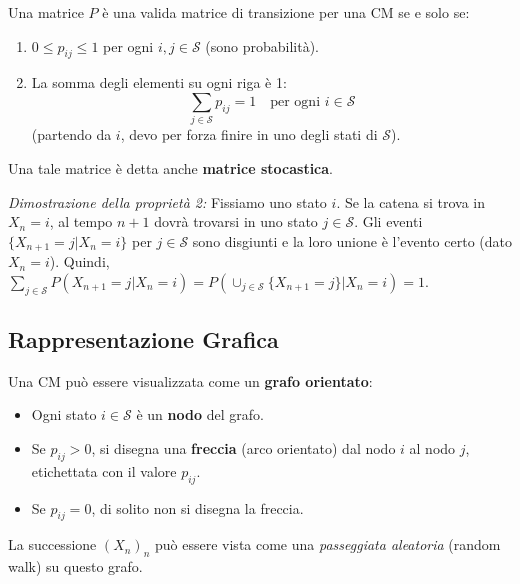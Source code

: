 \begin{theorem}
Una matrice $P$ è una valida matrice di transizione per una CM se e solo se:
\begin{enumerate}
    \item $0 \le p_{ij} \le 1$ per ogni $i, j \in \mathcal{S}$ (sono probabilità).
    \item La somma degli elementi su ogni riga è 1:
    \begin{equation}
        \sum_{j \in \mathcal{S}} p_{ij} = 1 \quad \text{per ogni } i \in \mathcal{S}
    \end{equation}
    (partendo da $i$, devo per forza finire in uno degli stati di $\mathcal{S}$).
\end{enumerate}
Una tale matrice è detta anche \textbf{matrice stocastica}.
\end{theorem}
\textit{Dimostrazione della proprietà 2:}
Fissiamo uno stato $i$. Se la catena si trova in $X_n=i$, al tempo $n+1$ dovrà trovarsi in uno stato $j \in \mathcal{S}$. Gli eventi $\{X_{n+1}=j | X_n=i\}$ per $j \in \mathcal{S}$ sono disgiunti e la loro unione è l'evento certo (dato $X_n=i$). Quindi, $\sum_{j \in \mathcal{S}} P(X_{n+1}=j | X_n=i) = P(\cup_{j \in \mathcal{S}} \{X_{n+1}=j\} | X_n=i) = 1$.

\subsection{Rappresentazione Grafica}
Una CM può essere visualizzata come un \textbf{grafo orientato}:
\begin{itemize}
    \item Ogni stato $i \in \mathcal{S}$ è un \textbf{nodo} del grafo.
    \item Se $p_{ij} > 0$, si disegna una \textbf{freccia} (arco orientato) dal nodo $i$ al nodo $j$, etichettata con il valore $p_{ij}$.
    \item Se $p_{ij} = 0$, di solito non si disegna la freccia.
\end{itemize}
La successione $(X_n)_n$ può essere vista come una \textit{passeggiata aleatoria} (random walk) su questo grafo.

